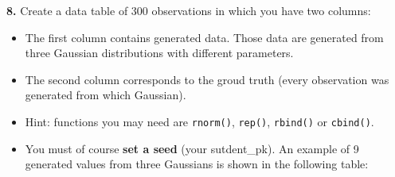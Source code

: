 \documentclass[]{book}
\providecommand{\tightlist}{%
  \setlength{\itemsep}{0pt}\setlength{\parskip}{0pt}}
\theoremstyle{definition}
\theoremstyle{definition}
\theoremstyle{definition}
\theoremstyle{remark}
\begin{document}
\textbf{8.} Create a data table of 300 observations in which you have
two columns:

\begin{itemize}
\tightlist
\item
  The first column contains generated data. Those data are generated
  from three Gaussian distributions with different parameters.
\item
  The second column corresponds to the groud truth (every observation
  was generated from which Gaussian).
\item
  Hint: functions you may need are \texttt{rnorm()}, \texttt{rep()},
  \texttt{rbind()} or \texttt{cbind()}.
\item
  You must of course \textbf{set a seed} (your sutdent\_pk). An example
  of 9 generated values from three Gaussians is shown in the following
  table:
\end{itemize}
\end{document}
